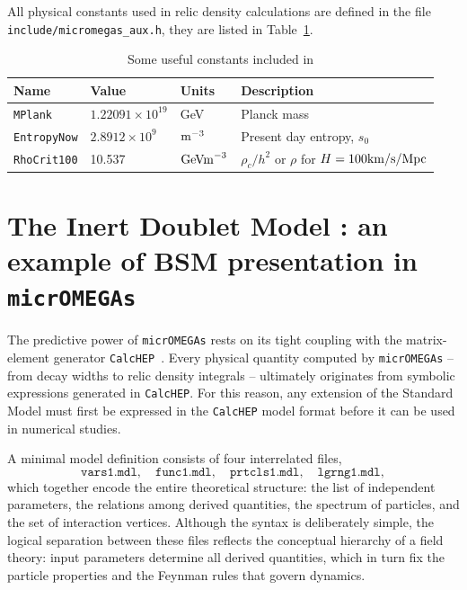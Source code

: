 \documentclass[12pt,a4paper]{article}
\begin{document}
All physical constants used in relic density calculations are defined  in the  file \\
\verb|include/micromegas_aux.h|,  they   are listed in Table~\ref{tab:constants}.

\begin{table}[ht!]\centering
\caption{Some useful constants included in \micro}
\label{tab:constants}
\begin{tabular}{| llll |}
\hline
Name & Value & Units & Description\\\hline
\verb|MPlank| &     $1.22091\times 10^{19}$  &  GeV & Planck mass    \\
\verb|EntropyNow| &  $2.8912\times 10^{9}$    & ${\rm m}^{-3}$ & Present day entropy, $s_0$     \\
\verb|RhoCrit100| & 10.537     & ${\rm GeV m}^{-3}$  & $\rho_c/h^2$  or $\rho$ for $H=100 {\rm km/s/Mpc}$ \\\hline
\end{tabular}\vspace*{3mm}
\end{table}



\section{The Inert Doublet Model : an example of BSM presentation in \texttt{micrOMEGAs}}

The predictive power of \texttt{micrOMEGAs} rests on its tight coupling with the matrix-element generator \texttt{CalcHEP}~\cite{Belyaev:2012qa}.  
Every physical quantity computed by \texttt{micrOMEGAs} -- from decay widths to relic density integrals -- ultimately originates from symbolic expressions generated in \texttt{CalcHEP}.  
For this reason, any extension of the Standard Model must first be expressed in the \texttt{CalcHEP} model format before it can be used in numerical studies.

A minimal model definition consists of four interrelated files,
\[
\texttt{vars1.mdl}, \quad \texttt{func1.mdl}, \quad \texttt{prtcls1.mdl}, \quad \texttt{lgrng1.mdl},
\]
which together encode the entire theoretical structure:
the list of independent parameters, the relations among derived quantities, the spectrum of particles, and the set of interaction vertices.
Although the syntax is deliberately simple, the logical separation between these files reflects the conceptual hierarchy of a field theory:  
input parameters determine all derived quantities, which in turn fix the particle properties and the Feynman rules that govern dynamics.
\end{document}
